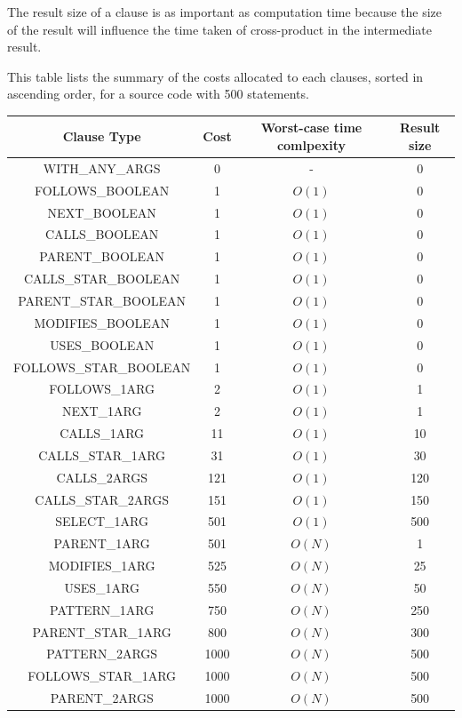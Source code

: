 \documentclass[12pt]{article}
\begin{document}
{{{{{{{{{{{{{The result size of a clause is as important as computation time because the size of the result will influence the time taken of cross-product in the intermediate result.

This table lists the summary of the costs allocated to each clauses, sorted in ascending order, for a source code with 500 statements. \newline
\begin{center}
\begin{longtable}{ |c|c|c|c| }
\hline
\textbf{ Clause Type}	 & \textbf{Cost} & \textbf{Worst-case time comlpexity} & \textbf{Result size}\\ \hline
\footnotesize
WITH\_ANY\_ARGS&0&-&0\\\hline
FOLLOWS\_BOOLEAN&1&$O(1)$&0\\\hline
NEXT\_BOOLEAN&1&$O(1)$&0\\\hline
CALLS\_BOOLEAN&1&$O(1)$&0\\\hline
PARENT\_BOOLEAN&1&$O(1)$&0\\\hline
CALLS\_STAR\_BOOLEAN&1&$O(1)$&0\\\hline
PARENT\_STAR\_BOOLEAN&1&$O(1)$&0\\\hline
MODIFIES\_BOOLEAN&1&$O(1)$&0\\\hline
USES\_BOOLEAN&1&$O(1)$&0\\\hline
FOLLOWS\_STAR\_BOOLEAN&1&$O(1)$&0\\\hline
FOLLOWS\_1ARG&2&$O(1)$&1\\\hline
NEXT\_1ARG&2&$O(1)$&1\\\hline
CALLS\_1ARG&11&$O(1)$&10\\\hline
CALLS\_STAR\_1ARG&31&$O(1)$&30\\\hline
CALLS\_2ARGS&121&$O(1)$&120\\\hline
CALLS\_STAR\_2ARGS&151&$O(1)$&150\\\hline
SELECT\_1ARG&501&$O(1)$&500\\\hline
PARENT\_1ARG&501&$O(N)$&1\\\hline
MODIFIES\_1ARG&525&$O(N)$&25\\\hline
USES\_1ARG&550&$O(N)$&50\\\hline
PATTERN\_1ARG&750&$O(N)$&250\\\hline
PARENT\_STAR\_1ARG&800&$O(N)$&300\\\hline
PATTERN\_2ARGS&1000&$O(N)$&500\\\hline
FOLLOWS\_STAR\_1ARG&1000&$O(N)$&500\\\hline
PARENT\_2ARGS&1000&$O(N)$&500\\\hline

\end{longtable}
\end{center}}}}}}}}}}}}}}
\end{document}
